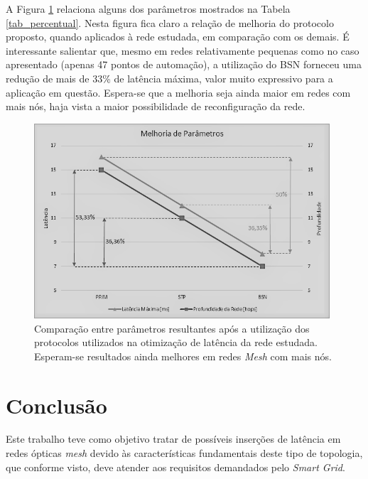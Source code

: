 \documentclass[12pt]{article}
\begin{document}
A Figura \ref{fig_tab_percentual} relaciona alguns dos parâmetros mostrados na Tabela \ref{tab_percentual}. Nesta figura fica claro a relação de melhoria do protocolo proposto, quando aplicados à rede estudada, em comparação com os demais. É interessante salientar que, mesmo em redes relativamente pequenas como no caso apresentado (apenas 47 pontos de automação), a utilização do BSN forneceu uma redução de mais de 33\% de latência máxima, valor muito expressivo para a aplicação em questão. Espera-se que a melhoria seja ainda maior em redes com mais nós, haja vista a maior possibilidade de reconfiguração da rede. 

\begin{figure} %
	\centering
	\includegraphics[width=11cm]{Tabela2GraficoPB}
	\caption{Comparação entre parâmetros resultantes após a utilização dos protocolos utilizados na otimização de latência da rede estudada. Esperam-se resultados ainda melhores em redes \emph{Mesh} com mais nós.}
	\label{fig_tab_percentual}
\end{figure}

\section{Conclusão}
\label{sec:conclusao}

%
Este trabalho teve como objetivo tratar de possíveis inserções de latência em redes ópticas \emph{mesh} devido às características fundamentais deste tipo de topologia, que conforme visto, deve atender aos requisitos demandados pelo \emph{Smart Grid}.
\end{document}
